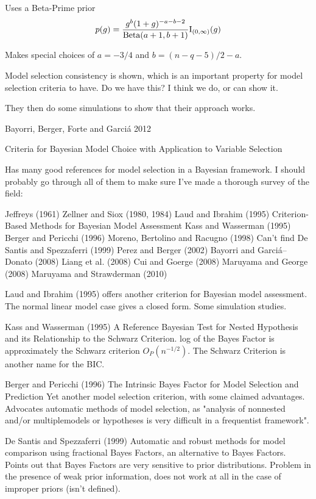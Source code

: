 \documentclass{amsart}[12pt]
\begin{document}
Uses a Beta-Prime prior
\[
p(g) = \frac{g^b (1 + g)^{-a-b-2}}{\text{Beta}(a + 1, b + 1)} \text{I}_{(0, \infty)}(g)
\]

Makes special choices of $a = -3/4$ and $b = (n - q - 5)/2 - a$.

Model selection consistency is shown, which is an important property for model selection criteria to have. Do
we have this? I think we do, or can show it.

They then do some simulations to show that their approach works.

Bayorri, Berger, Forte and Garci\'{a} 2012

Criteria for Bayesian Model Choice with Application to Variable Selection

Has many good references for model selection in a Bayesian framework. I should probably go through all of them
to make sure I've made a thorough survey of the field:

Jeffreys (1961)
Zellner and Siox (1980, 1984)
Laud and Ibrahim (1995) Criterion-Based Methods for Bayesian Model Assessment
Kass and Wasserman (1995)
Berger and Pericchi (1996)
Moreno, Bertolino and Racugno (1998) Can't find
De Santis and Spezzaferri (1999)
Perez and Berger (2002)
Bayorri and Garci\'{a}--Donato (2008)
Liang et al. (2008)
Cui and Goerge (2008)
Maruyama and George (2008)
Maruyama and Strawderman (2010)

Laud and Ibrahim (1995) offers another criterion for Bayesian model assessment. The normal linear model case
gives a closed form. Some simulation studies.

Kass and Wasserman (1995) A Reference Bayesian Test for Nested Hypothesis and its Relationship to the
Schwarz Criterion. log of the Bayes Factor is approximately the Schwarz criterion $O_P(n^{-1/2})$. The
Schwarz Criterion is another name for the BIC.

Berger and Pericchi (1996) The Intrinsic Bayes Factor for Model Selection and Prediction
Yet another model selection criterion, with some claimed advantages. Advocates automatic methods of model 
selection, as "analysis of nonnested and/or multiplemodels or hypotheses is very difficult in a frequentist
framework".

De Santis and Spezzaferri (1999) Automatic and robust methods for model comparison using fractional Bayes
Factors, an alternative to Bayes Factors. Points out that Bayes Factors are very sensitive to prior
distributions. Problem in the presence of weak prior information, does not work at all in the case of improper
priors (isn't defined).
\end{document}

